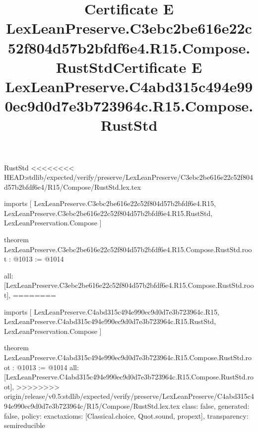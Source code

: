 \begin{lexlean}{RustStd}
<<<<<<<< HEAD:stdlib/expected/verify/preserve/LexLeanPreserve/C3ebc2be616e22c52f804d57b2bfdf6e4/R15/Compose/RustStd.lex.tex
\title{Certificate E LexLeanPreserve.C3ebc2be616e22c52f804d57b2bfdf6e4.R15.Compose.RustStd}
\begin{coremodule}
imports [
  LexLeanPreserve.C3ebc2be616e22c52f804d57b2bfdf6e4.R15,
  LexLeanPreserve.C3ebc2be616e22c52f804d57b2bfdf6e4.R15.RustStd,
  LexLeanPreservation.Compose
]

theorem LexLeanPreserve.C3ebc2be616e22c52f804d57b2bfdf6e4.R15.Compose.RustStd.root : @1013 := @1014 {
  all: [LexLeanPreserve.C3ebc2be616e22c52f804d57b2bfdf6e4.R15.Compose.RustStd.root],
========
\title{Certificate E LexLeanPreserve.C4abd315c494e990ec9d0d7e3b723964c.R15.Compose.RustStd}
\begin{coremodule}
imports [
  LexLeanPreserve.C4abd315c494e990ec9d0d7e3b723964c.R15,
  LexLeanPreserve.C4abd315c494e990ec9d0d7e3b723964c.R15.RustStd,
  LexLeanPreservation.Compose
]

theorem LexLeanPreserve.C4abd315c494e990ec9d0d7e3b723964c.R15.Compose.RustStd.root : @1013 := @1014 {
  all: [LexLeanPreserve.C4abd315c494e990ec9d0d7e3b723964c.R15.Compose.RustStd.root],
>>>>>>>> origin/release/v0.5:stdlib/expected/verify/preserve/LexLeanPreserve/C4abd315c494e990ec9d0d7e3b723964c/R15/Compose/RustStd.lex.tex
  class: false,
  generated: false,
  policy: exact{axioms: [Classical.choice, Quot.sound, propext]},
  transparency: semireducible
}


\end{coremodule}}
\end{coremodule}
\end{lexlean}
